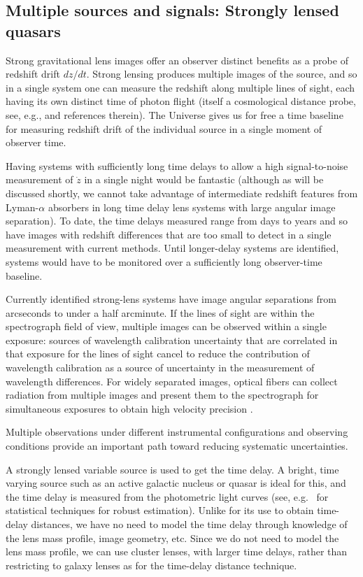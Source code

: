 \documentclass[preprint2, 10pt]{aastex}
\begin{document}
{%
\subsection{Multiple sources and signals: Strongly lensed quasars} \label{sec:lens} 

Strong gravitational lens images offer an observer distinct
benefits as a probe of redshift drift $dz/dt$. Strong lensing produces multiple images of the source, 
and so in a single system one can measure the redshift along multiple 
lines of sight, each having its own distinct time of photon flight (itself
a cosmological distance probe, see, e.g., \citet{13061272} 
and references therein).
The Universe gives us for free a time baseline for measuring
redshift drift of the individual source in a single moment of observer time.


Having systems with sufficiently long time delays to allow a
high signal-to-noise measurement of $\dot{z}$ in a single night would
be fantastic (although as will be discussed shortly, we cannot take advantage of intermediate redshift features from 
Lyman-$\alpha$ absorbers in long time delay lens systems with large angular image separation).
To date, the time delays measured range from days to
years \citep{2007ApJ...662...62F,2008ApJ...676..761F, 2013ApJ...764..186F}
and so have images with redshift
differences that are too small to detect in a single measurement with current methods.
Until longer-delay systems are identified, systems would
have to be monitored over a sufficiently long observer-time baseline.


Currently identified strong-lens systems have image angular separations from arcseconds
to under a half arcminute.
If the lines of sight are within the spectrograph field of view,
multiple images can be observed within a single exposure: sources of
wavelength calibration uncertainty that are correlated in that exposure
for the lines of sight cancel to reduce the contribution of wavelength
calibration as a source of uncertainty in the measurement of
wavelength differences.
For widely separated images, optical fibers can collect radiation from multiple images
and present them to the spectrograph for simultaneous exposures to obtain high velocity precision \citep{2012SPIE.8446E..1VC}.

Multiple observations under different instrumental configurations
and observing conditions provide an important path toward reducing systematic
uncertainties. 

A strongly lensed variable source is used to get the time delay. A bright, time varying source 
such as an active galactic nucleus or quasar is ideal for this, and the time delay is measured from 
the photometric light curves (see, e.g.\ \citet{tewes,hkl} for statistical 
techniques for robust estimation).
Unlike for its use to obtain time-delay distances, 
we have no need to model the time delay through knowledge of the lens mass 
profile, image geometry, etc.
Since we do not need to model the lens mass profile, we can 
use cluster lenses, with larger time delays, rather than restricting to 
galaxy lenses as for the time-delay distance technique.

}
\end{document}
